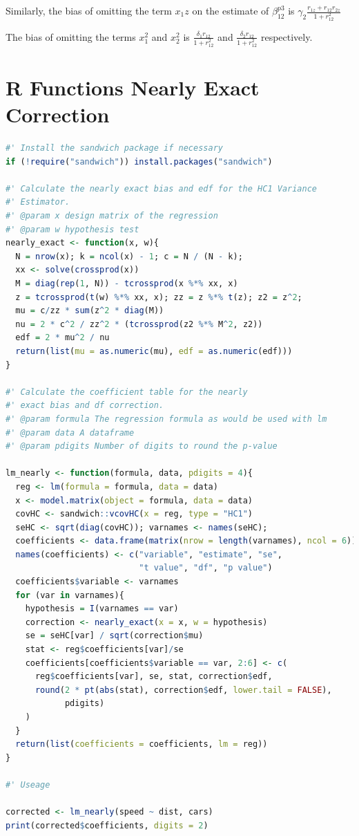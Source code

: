 \documentclass[12pt]{article}
\begin{document}
Similarly, the bias of omitting the term $x_1 z$ on the estimate of $\beta^{p3}_{12}$ is  $\gamma_2 \frac{r_{1z} + r_{12} r_{2z}}{1 + r_{12}^2}$

The bias of omitting the terms $x_1^2$ and $x_2^2$ is $\frac{\delta_1 r_{12}}{1 + r_{12}^2}$ and $\frac{\delta_2 r_{12}}{1 + r_{12}^2}$ respectively.

\newpage
\section{R Functions Nearly Exact Correction} \label{appendix-R}
\begin{lstlisting}[language=R]
#' Install the sandwich package if necessary
if (!require("sandwich")) install.packages("sandwich")

#' Calculate the nearly exact bias and edf for the HC1 Variance
#' Estimator.
#' @param x design matrix of the regression
#' @param w hypothesis test
nearly_exact <- function(x, w){
  N = nrow(x); k = ncol(x) - 1; c = N / (N - k);
  xx <- solve(crossprod(x))
  M = diag(rep(1, N)) - tcrossprod(x %*% xx, x)
  z = tcrossprod(t(w) %*% xx, x); zz = z %*% t(z); z2 = z^2;
  mu = c/zz * sum(z^2 * diag(M))
  nu = 2 * c^2 / zz^2 * (tcrossprod(z2 %*% M^2, z2))
  edf = 2 * mu^2 / nu
  return(list(mu = as.numeric(mu), edf = as.numeric(edf)))
}

#' Calculate the coefficient table for the nearly
#' exact bias and df correction.
#' @param formula The regression formula as would be used with lm
#' @param data A dataframe
#' @param pdigits Number of digits to round the p-value

lm_nearly <- function(formula, data, pdigits = 4){
  reg <- lm(formula = formula, data = data)
  x <- model.matrix(object = formula, data = data)
  covHC <- sandwich::vcovHC(x = reg, type = "HC1")
  seHC <- sqrt(diag(covHC)); varnames <- names(seHC); 
  coefficients <- data.frame(matrix(nrow = length(varnames), ncol = 6))
  names(coefficients) <- c("variable", "estimate", "se",
                           "t value", "df", "p value")
  coefficients$variable <- varnames
  for (var in varnames){
    hypothesis = I(varnames == var)
    correction <- nearly_exact(x = x, w = hypothesis)
    se = seHC[var] / sqrt(correction$mu)
    stat <- reg$coefficients[var]/se
    coefficients[coefficients$variable == var, 2:6] <- c(
      reg$coefficients[var], se, stat, correction$edf, 
      round(2 * pt(abs(stat), correction$edf, lower.tail = FALSE),
            pdigits)
    )
  }
  return(list(coefficients = coefficients, lm = reg))
}

#' Useage

corrected <- lm_nearly(speed ~ dist, cars)
print(corrected$coefficients, digits = 2)
\end{lstlisting}
\end{document}
